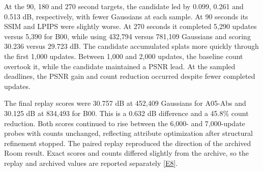 At the 90, 180 and 270 second targets, the candidate led by 0.099, 0.261 and 0.513 dB, respectively, with fewer Gaussians at each sample. At 90 seconds its SSIM and LPIPS were slightly worse. At 270 seconds it completed 5,290 updates versus 5,390 for B00, while using 432,794 versus 781,109 Gaussians and scoring 30.236 versus 29.723 dB. The candidate accumulated splats more quickly through the first 1,000 updates. Between 1,000 and 2,000 updates, the baseline count overtook it, while the candidate maintained a PSNR lead. At the sampled deadlines, the PSNR gain and count reduction occurred despite fewer completed updates.

The final replay scores were 30.757 dB at 452,409 Gaussians for A05-Abs and 30.125 dB at 834,493 for B00. This is a 0.632 dB difference and a 45.8\% count reduction. Both scores continued to rise between the 6,000- and 7,000-update probes with counts unchanged, reflecting attribute optimization after structural refinement stopped. The paired replay reproduced the direction of the archived Room result. Exact scores and counts differed slightly from the archive, so the replay and archived values are reported separately [\hyperlink{evE8}{E8}].
